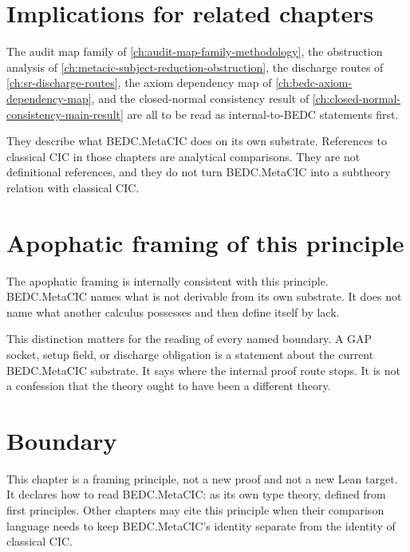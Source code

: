 \section{Implications for related chapters}
\label{sec:bedc-is-its-own-theory-implications}

The audit map family of \autoref{ch:audit-map-family-methodology}, the
obstruction analysis of \autoref{ch:metacic-subject-reduction-obstruction},
the discharge routes of \autoref{ch:sr-discharge-routes}, the axiom
dependency map of \autoref{ch:bedc-axiom-dependency-map}, and the
closed-normal consistency result of
\autoref{ch:closed-normal-consistency-main-result} are all to be read as
internal-to-BEDC statements first.

They describe what BEDC.MetaCIC does on its own substrate. References to
classical CIC in those chapters are analytical comparisons. They are not
definitional references, and they do not turn BEDC.MetaCIC into a
subtheory relation with classical CIC.

\section{Apophatic framing of this principle}
\label{sec:bedc-is-its-own-theory-apophatic-framing}

The apophatic framing is internally consistent with this principle.
BEDC.MetaCIC names what is not derivable from its own substrate. It does
not name what another calculus possesses and then define itself by lack.

This distinction matters for the reading of every named boundary. A GAP
socket, setup field, or discharge obligation is a statement about the
current BEDC.MetaCIC substrate. It says where the internal proof route
stops. It is not a confession that the theory ought to have been a
different theory.

\section{Boundary}
\label{sec:bedc-is-its-own-theory-boundary}

This chapter is a framing principle, not a new proof and not a new Lean
target. It declares how to read BEDC.MetaCIC: as its own type theory,
defined from first principles. Other chapters may cite this principle
when their comparison language needs to keep BEDC.MetaCIC's identity
separate from the identity of classical CIC.

